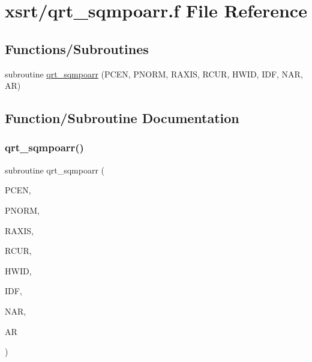 \hypertarget{qrt__sqmpoarr_8f}{}\section{xsrt/qrt\+\_\+sqmpoarr.f File Reference}
\label{qrt__sqmpoarr_8f}
\subsection*{Functions/\+Subroutines}
\begin{DoxyCompactItemize}
\item 
subroutine \hyperlink{qrt__sqmpoarr_8f_aba60ff5fabd1a96c56041459728ac6ee}{qrt\+\_\+sqmpoarr} (P\+C\+EN, P\+N\+O\+RM, R\+A\+X\+IS, R\+C\+UR, H\+W\+ID, I\+DF, N\+AR, AR)
\end{DoxyCompactItemize}


\subsection{Function/\+Subroutine Documentation}
\mbox{\label{qrt__sqmpoarr_8f_aba60ff5fabd1a96c56041459728ac6ee}} 
\subsubsection{\texorpdfstring{qrt\+\_\+sqmpoarr()}{qrt\_sqmpoarr()}}
{\footnotesize\ttfamily subroutine qrt\+\_\+sqmpoarr (\begin{DoxyParamCaption}\item[{double precision, dimension(3)}]{P\+C\+EN,  }\item[{double precision, dimension(3)}]{P\+N\+O\+RM,  }\item[{double precision, dimension(3)}]{R\+A\+X\+IS,  }\item[{double precision}]{R\+C\+UR,  }\item[{double precision}]{H\+W\+ID,  }\item[{integer}]{I\+DF,  }\item[{integer}]{N\+AR,  }\item[{double precision, dimension(nar)}]{AR }\end{DoxyParamCaption})}

